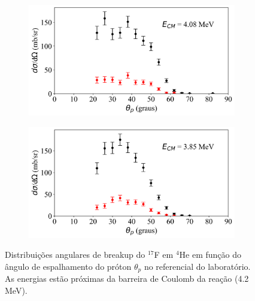 \documentclass[a4paper,12pt,oneside]{book}
\begin{document}
\begin{figure}[H]
\begin{subfigure}[b]{0.48\textwidth}
        \caption{}
        \label{subfig:dist_ang_j}
    \end{subfigure}%
    \hfill
    \begin{subfigure}[b]{0.49\textwidth}
        \centering
        \includegraphics[scale=0.38, width=1.\columnwidth]{figs/dist_angs/dist_ang_10.png}
        \caption{}
        \label{subfig:dist_ang_k}
    \end{subfigure}
    \begin{subfigure}[b]{0.48\textwidth}
        \centering
        \includegraphics[scale=0.38, width=1.\columnwidth]{figs/dist_angs/dist_ang_11.png}
        \caption{}
        \label{subfig:dist_ang_l}
    \end{subfigure}%
    \hfill
\caption{Distribuições angulares de breakup do $^{17}$F em $^4$He em função do ângulo de espalhamento do próton $\theta_p$ no referencial do laboratório. As energias estão próximas da barreira de Coulomb da reação (4.2 MeV).}
\label{fig:dist_ang_prox}
\end{figure}
\end{document}
